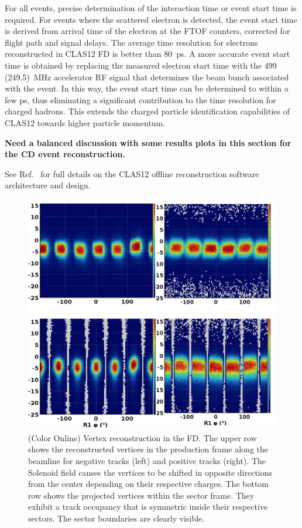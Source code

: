 \documentclass[final,3p,twocolumn]{elsarticle}
\begin{document}
For all events, precise determination of the interaction time or event start time is required. For events where the
scattered electron is detected, the event start time is derived from arrival time of the electron at the FTOF counters, 
corrected for flight path and signal delays.  The average time resolution for electrons reconstructed in CLAS12 FD is
better than 80~ps. A more accurate event start time is obtained by replacing the measured electron start time with the
499 (249.5)~MHz accelerator RF signal that determines the beam bunch associated with the event. In this way, the event
start time can be determined to within a few ps, thus eliminating a significant contribution to the time resolution for
charged hadrons. This extends the charged particle identification capabilities of CLAS12 towards higher particle
momentum.

{\bf Need a balanced discussion with some results plots in this section for the CD event reconstruction.}

See Ref.~\cite{Software} for full details on the CLAS12 offline reconstruction software architecture and design.

\begin{figure}[htbp!]
\centerline {
\includegraphics[width=0.96\columnwidth]{tracking_vertices.png}}
\caption{(Color Online) Vertex reconstruction in the FD. The upper row shows the reconstructed vertices in the production frame along
the beamline for negative tracks (left) and positive tracks (right). The Solenoid field causes the vertices to be shifted
in opposite directions from the center depending on their respective charges. The bottom row shows the projected
vertices within the sector frame. They exhibit a track occupancy that is symmetric inside their respective sectors. The
sector boundaries are clearly visible.} 
\label{vertex}
\end{figure}
\end{document}

